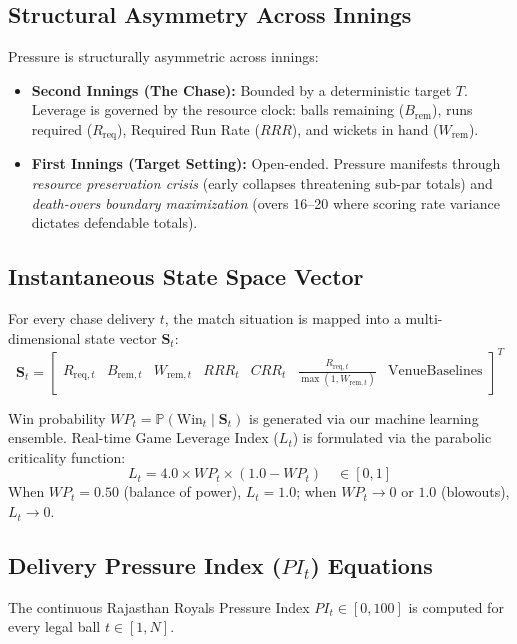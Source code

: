 \documentclass[11pt,a4paper]{article}
\begin{document}
\subsection{Structural Asymmetry Across Innings}
Pressure is structurally asymmetric across innings:
\begin{itemize}[leftmargin=*,itemsep=2pt]
    \item \textbf{Second Innings (The Chase):} Bounded by a deterministic target $T$. Leverage is governed by the resource clock: balls remaining ($B_{\text{rem}}$), runs required ($R_{\text{req}}$), Required Run Rate ($RRR$), and wickets in hand ($W_{\text{rem}}$).
    \item \textbf{First Innings (Target Setting):} Open-ended. Pressure manifests through \textit{resource preservation crisis} (early collapses threatening sub-par totals) and \textit{death-overs boundary maximization} (overs 16--20 where scoring rate variance dictates defendable totals).
\end{itemize}

\subsection{Instantaneous State Space Vector}
For every chase delivery $t$, the match situation is mapped into a multi-dimensional state vector $\mathbf{S}_t$:
\begin{equation}
\mathbf{S}_t = \begin{bmatrix}
R_{\text{req}, t} & B_{\text{rem}, t} & W_{\text{rem}, t} & RRR_t & CRR_t & \frac{R_{\text{req}, t}}{\max(1, W_{\text{rem}, t})} & \text{VenueBaselines}
\end{bmatrix}^T
\end{equation}

Win probability $WP_t = \mathbb{P}(\text{Win}_t \mid \mathbf{S}_t)$ is generated via our machine learning ensemble. Real-time Game Leverage Index ($L_t$) is formulated via the parabolic criticality function:
\begin{equation}
L_t = 4.0 \times WP_t \times (1.0 - WP_t) \quad \in [0, 1]
\end{equation}
When $WP_t = 0.50$ (balance of power), $L_t = 1.0$; when $WP_t \to 0$ or $1.0$ (blowouts), $L_t \to 0$.

\subsection{Delivery Pressure Index ($PI_t$) Equations}
The continuous Rajasthan Royals Pressure Index $PI_t \in [0, 100]$ is computed for every legal ball $t \in [1, N]$.
\end{document}
